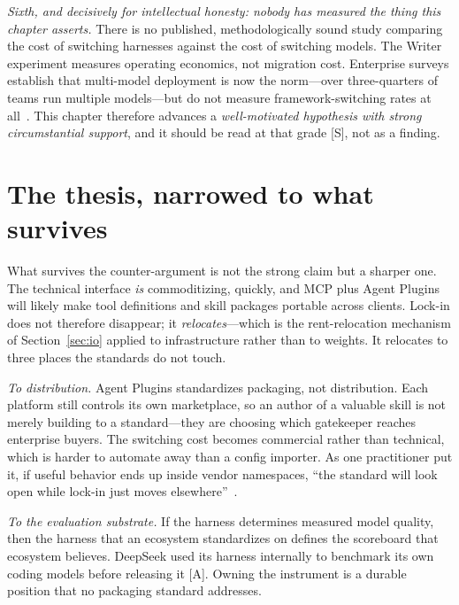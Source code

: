 \emph{Sixth, and decisively for intellectual honesty: nobody has measured the thing this chapter asserts.} There is no published, methodologically sound study comparing the cost of switching harnesses against the cost of switching models. The Writer experiment measures operating economics, not migration cost. Enterprise surveys establish that multi-model deployment is now the norm---over three-quarters of teams run multiple models---but do not measure framework-switching rates at all~\cite{langchain-survey}. This chapter therefore advances a \emph{well-motivated hypothesis with strong circumstantial support}, and it should be read at that grade [S], not as a finding.

\section{The thesis, narrowed to what survives}
\label{sec:harness-survives}

What survives the counter-argument is not the strong claim but a sharper one. The technical interface \emph{is} commoditizing, quickly, and MCP plus Agent Plugins will likely make tool definitions and skill packages portable across clients. Lock-in does not therefore disappear; it \emph{relocates}---which is the rent-relocation mechanism of Section~\ref{sec:io} applied to infrastructure rather than to weights. It relocates to three places the standards do not touch.

\emph{To distribution.} Agent Plugins standardizes packaging, not distribution. Each platform still controls its own marketplace, so an author of a valuable skill is not merely building to a standard---they are choosing which gatekeeper reaches enterprise buyers. The switching cost becomes commercial rather than technical, which is harder to automate away than a config importer. As one practitioner put it, if useful behavior ends up inside vendor namespaces, ``the standard will look open while lock-in just moves elsewhere''~\cite{agent-plugins-newstack}.

\emph{To the evaluation substrate.} If the harness determines measured model quality, then the harness that an ecosystem standardizes on defines the scoreboard that ecosystem believes. DeepSeek used its harness internally to benchmark its own coding models before releasing it [A]. Owning the instrument is a durable position that no packaging standard addresses.

